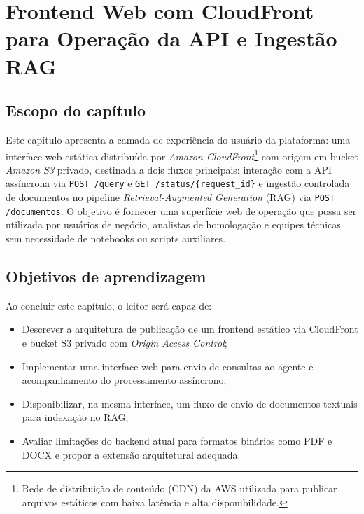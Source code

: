 \chapter{Frontend Web com CloudFront para Operação da API e Ingestão RAG}
\label{chap:frontend_cloudfront_console}

\section{Escopo do cap\'itulo}

Este cap\'itulo apresenta a camada de experi\^encia do usu\'ario da
plataforma: uma interface web est\'atica distribu\'ida por
\textit{Amazon CloudFront}\footnote{%
  Rede de distribui\c{c}\~ao de conte\'udo (CDN) da AWS utilizada para
  publicar arquivos est\'aticos com baixa lat\^encia e alta disponibilidade.}
com origem em bucket \textit{Amazon S3} privado,
destinada a dois fluxos principais: intera\c{c}\~ao com a API ass\'incrona
via \texttt{POST /query} e \texttt{GET /status/\{request\_id\}} e ingest\~ao
controlada de documentos no pipeline \textit{Retrieval-Augmented Generation}
(RAG) via \texttt{POST /documentos}. O objetivo \'e
fornecer uma superf\'icie web de opera\c{c}\~ao que possa ser utilizada por
usu\'arios de neg\'ocio, analistas de homologa\c{c}\~ao e equipes t\'ecnicas sem
necessidade de notebooks ou scripts auxiliares.

\section{Objetivos de aprendizagem}

Ao concluir este cap\'itulo, o leitor ser\'a capaz de:

\begin{itemize}[leftmargin=*]
  \item Descrever a arquitetura de publica\c{c}\~ao de um frontend
        est\'atico via CloudFront e bucket S3 privado com
        \textit{Origin Access Control};
  \item Implementar uma interface web para envio de consultas ao agente
        e acompanhamento do processamento ass\'incrono;
  \item Disponibilizar, na mesma interface, um fluxo de envio de
        documentos textuais para indexa\c{c}\~ao no RAG;
  \item Avaliar limita\c{c}\~oes do backend atual para formatos bin\'arios
        como PDF e DOCX e propor a extens\~ao arquitetural adequada.
\end{itemize}


